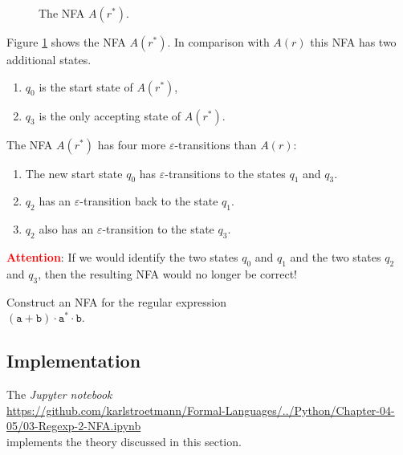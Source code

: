 \begin{enumerate}
      \begin{figure}[!ht]
        \centering
      \caption{The \textsc{NFA} $A(r^*)$.}
      \label{fig:aStar.eps}
      \end{figure}
      Figure \ref{fig:aStar.eps} shows the \textsc{NFA} $A(r^*)$.
      In comparison with $A(r)$ this \textsc{NFA} has two additional states.
      \begin{enumerate}
      \item $q_0$ is the start state of $A(r^*)$,
      \item $q_3$ is the only accepting state of $A(r^*)$.
      \end{enumerate}
      The \textsc{NFA} $A(r^*)$ has four more $\varepsilon$-transitions than $A(r)$: 
      \begin{enumerate}
      \item The new start state  $q_0$ has $\varepsilon$-transitions to the states
            $q_1$ and $q_3$.
      \item $q_2$ has an $\varepsilon$-transition back to the state $q_1$.
      \item $q_2$ also has an $\varepsilon$-transition to the state $q_3$.
      \end{enumerate}
      \textbf{\textcolor{red}{Attention}}:  If we would identify the two states 
      $q_0$ and $q_1$ and the two states $q_2$ and $q_3$, then the resulting \textsc{NFA} would no longer be
      correct!
\end{enumerate}

\exerciseEng
Construct an \textsc{NFA} for the regular expression
\\[0.2cm]
\hspace*{1.3cm}
$(\texttt{a} + \texttt{b}) \cdot \texttt{a}^* \cdot \texttt{b}$.  
\eox

\subsection{Implementation}
The \textsl{Jupyter notebook} 
\\[0.2cm]
\hspace*{0.0cm}
\href{https://github.com/karlstroetmann/Formal-Languages/blob/master/Python/Chapter-04-05/03-Regexp-2-NFA.ipynb}{https://github.com/karlstroetmann/Formal-Languages/../Python/Chapter-04-05/03-Regexp-2-NFA.ipynb} 
\\[0.2cm]
implements the theory discussed in this section.




